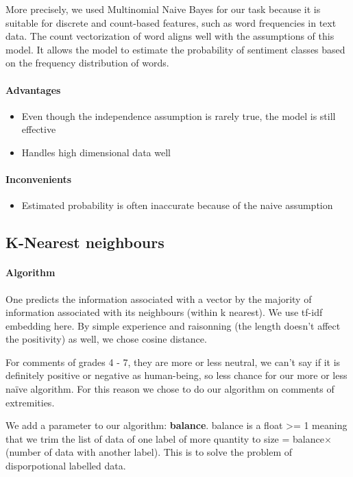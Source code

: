 \documentclass{article}
\begin{document}
More precisely, we used Multinomial Naive Bayes for our task because it is suitable for discrete and count-based features, such as word frequencies in text data. The count vectorization of word aligns well with the assumptions of this model. It allows the model to estimate the probability of sentiment classes based on the frequency distribution of words.

\paragraph{Advantages} \begin{itemize}
\item Even though the independence assumption is rarely true, the model is still effective
\item Handles high dimensional data well
\end{itemize}

\paragraph{Inconvenients} \begin{itemize}
\item Estimated probability is often inaccurate because of the naive assumption
\end{itemize}

\subsection{K-Nearest neighbours}
\label{subset:KNN}

\paragraph{Algorithm} One predicts the information associated with a vector by the majority
of information associated with its neighbours (within k nearest).
We use tf-idf embedding here.
By simple experience
and raisonning (the length doesn't affect the positivity) as well, we chose cosine distance.

For comments of grades 4 - 7, they are more or less neutral, we can't
say if it is definitely positive or negative as human-being, so less chance
for our more or less naïve algorithm. For this reason we chose
to do our algorithm on comments of extremities.

We add a parameter to our algorithm: \textbf{balance}.
balance is a float >= 1 meaning that we trim the list of data of one label
of more quantity to size = balance$\times$(number of data with another label).
This is to solve the problem of disporpotional labelled data.
\end{document}
